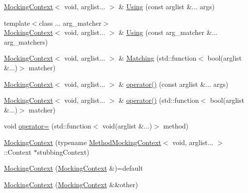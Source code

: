 \begin{DoxyCompactItemize}
\item 
\mbox{\hyperlink{classfakeit_1_1MockingContext}{Mocking\+Context}}$<$ void, arglist... $>$ \& \mbox{\hyperlink{classfakeit_1_1MockingContext_3_01void_00_01arglist_8_8_8_01_4_a0dad4e59214a5fdcacad0e4a170df071}{Using}} (const arglist \&... args)
\item 
{\footnotesize template$<$class ... arg\+\_\+matcher$>$ }\\\mbox{\hyperlink{classfakeit_1_1MockingContext}{Mocking\+Context}}$<$ void, arglist... $>$ \& \mbox{\hyperlink{classfakeit_1_1MockingContext_3_01void_00_01arglist_8_8_8_01_4_aaab0ad3883ab87bd3885671e3266546e}{Using}} (const arg\+\_\+matcher \&... arg\+\_\+matchers)
\item 
\mbox{\hyperlink{classfakeit_1_1MockingContext}{Mocking\+Context}}$<$ void, arglist... $>$ \& \mbox{\hyperlink{classfakeit_1_1MockingContext_3_01void_00_01arglist_8_8_8_01_4_a28152fc4e0105f5e6424515367a5d4c3}{Matching}} (std\+::function$<$ bool(arglist \&...)$>$ matcher)
\item 
\mbox{\hyperlink{classfakeit_1_1MockingContext}{Mocking\+Context}}$<$ void, arglist... $>$ \& \mbox{\hyperlink{classfakeit_1_1MockingContext_3_01void_00_01arglist_8_8_8_01_4_a73476d376f7ec5631ba9a37ff5264599}{operator()}} (const arglist \&... args)
\item 
\mbox{\hyperlink{classfakeit_1_1MockingContext}{Mocking\+Context}}$<$ void, arglist... $>$ \& \mbox{\hyperlink{classfakeit_1_1MockingContext_3_01void_00_01arglist_8_8_8_01_4_a1a5a55569a763877d395635979e6b3d6}{operator()}} (std\+::function$<$ bool(arglist \&...)$>$ matcher)
\item 
void \mbox{\hyperlink{classfakeit_1_1MockingContext_3_01void_00_01arglist_8_8_8_01_4_a86584df9e9a7a73b078ad68fa5893d50}{operator=}} (std\+::function$<$ void(arglist \&...)$>$ method)
\item 
\mbox{\hyperlink{classfakeit_1_1MockingContext_3_01void_00_01arglist_8_8_8_01_4_a655f7e31674dfb282f30a94f31ffd2a7}{Mocking\+Context}} (typename \mbox{\hyperlink{classfakeit_1_1MethodMockingContext}{Method\+Mocking\+Context}}$<$ void, arglist... $>$\+::Context $\ast$stubbing\+Context)
\item 
\mbox{\hyperlink{classfakeit_1_1MockingContext_3_01void_00_01arglist_8_8_8_01_4_a750dcc8fb80a9931c41143ce73d7177c}{Mocking\+Context}} (\mbox{\hyperlink{classfakeit_1_1MockingContext}{Mocking\+Context}} \&)=default
\item 
\mbox{\hyperlink{classfakeit_1_1MockingContext_3_01void_00_01arglist_8_8_8_01_4_a1f7b3663809191b919290f0db05d59f1}{Mocking\+Context}} (\mbox{\hyperlink{classfakeit_1_1MockingContext}{Mocking\+Context}} \&\&other)

\end{DoxyCompactItemize}
